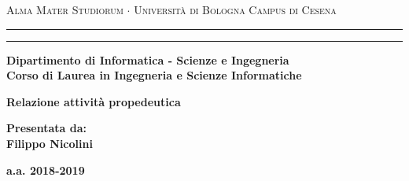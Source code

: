 \documentclass[12pt,a4paper]{report}
\begin{document}
\begin{titlepage}
\begin{center}
{{\Large{\textsc{Alma Mater Studiorum $\cdot$ Università di Bologna}}}}
{\small{\textsc{Campus di Cesena}}}
\rule[0.1cm]{15.8cm}{0.1mm}
\rule[0.5cm]{15.8cm}{0.6mm}
{\small{\bf Dipartimento di Informatica - Scienze e Ingegneria}}
\\
\medskip
{\small{\bf Corso di Laurea in Ingegneria e Scienze Informatiche}}
\end{center}
\vspace{15mm}
\begin{center}
{\LARGE{\bf Relazione attività propedeutica}}\\
\vspace{3mm}
\vspace{3mm}
\end{center}
\vspace{40mm}
\par
\noindent
\hfill
\begin{minipage}[t]{0.47\textwidth}\raggedleft
{\large{\bf Presentata da:\\
Filippo Nicolini}}
\end{minipage}
\vspace{20mm}
\begin{center}
{\large{\bf
a.a. 2018-2019 }}%
\end{center}
\end{titlepage}
\end{document}
